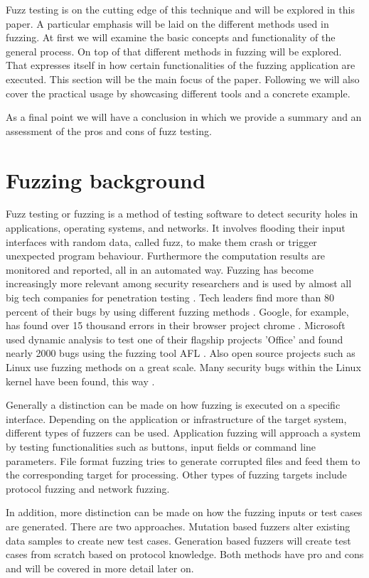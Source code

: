 \documentclass[journal=tosc,final]{iacrtrans}
\begin{document}
Fuzz testing is on the cutting edge of this technique and will be explored in this paper. A particular emphasis will be laid on the different methods used in fuzzing. 
At first we will examine the basic concepts and functionality of the general process. On top of that different methods in fuzzing will be explored. That expresses itself in how certain functionalities of the fuzzing application are executed. This section will be the main focus of the paper. Following we will also cover the practical usage by showcasing different tools and a concrete example. 

As a final point we will have a conclusion in which we provide a summary and an assessment of the pros and cons of fuzz testing. 
\newpage
\section{Fuzzing background}
Fuzz testing or fuzzing is a method of testing software to detect security holes in applications, operating systems, and networks. It involves flooding their input interfaces with random data, called fuzz, to make them crash or trigger unexpected program behaviour. Furthermore the computation results are monitored and reported, all in an automated way. Fuzzing has become increasingly more relevant among security researchers and is used by almost all big tech companies for penetration testing \cite{li2018fuzzing}. Tech leaders find more than 80 percent of their bugs by using different fuzzing methods \cite{method}. Google, for example, has found over 15 thousand errors in their browser project chrome \cite{google}. Microsoft used dynamic analysis to test one of their flagship projects 'Office' and found nearly 2000 bugs using the fuzzing tool AFL \cite{method}. Also open source projects such as Linux use fuzzing methods on a great scale. Many security bugs within the Linux kernel have been found, this way \cite{code}.

Generally a distinction can be made on how fuzzing is executed on a specific interface. Depending on the application or infrastructure of the target system, different types of fuzzers can be used. Application fuzzing will approach a system by testing functionalities such as buttons, input fields or command line parameters. File format fuzzing tries to generate corrupted files and feed them to the corresponding target for processing. Other types of fuzzing targets include protocol fuzzing and network fuzzing.

In addition, more distinction can be made on how the fuzzing inputs or test cases are generated. There are two approaches. Mutation based fuzzers alter existing data samples to create new test cases.
Generation based fuzzers will create test cases from scratch based on protocol knowledge. 
Both methods have pro and cons and will be covered in more detail later on.
\end{document}
